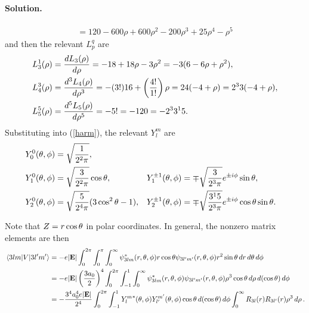 \documentclass[11pt]{article}
\newcommand{\refeq}[1]{(\ref{#1})}
\newenvironment{solution}
{
    \paragraph{Solution.}
    \ignorespaces
}
{
}
\begin{document}
\begin{solution}
\begin{align*}
		= 120 - 600 \rho + 600 \rho^2 - 200 \rho^3 + 25 \rho^4 - \rho^5
	\end{align*}
	and then the relevant $L_p^q$ are
	\begin{align*}
		L_3^1(\rho) &= \dv{L_3(\rho)}{\rho} 
		= -18 + 18 \rho - 3 \rho^2
		= -3 (6 - 6 \rho + \rho^2), \\
		L_4^3(\rho) &= \dv[3]{L_4(\rho)}{\rho}
		= -(3!) 16 + \left( \frac{4!}{1!} \right) \rho
		= 24 (-4 + \rho)
		= 2^3 3 (-4 + \rho), \\
		L_5^5(\rho) &= \dv[5]{L_5(\rho)}{\rho}
		= -5!
		= -120
		= -2^3 3^1 5.
	\end{align*}
	\clearpage
	Substituting into \refeq{harm}, the relevant $Y_l^m$ are
	\begin{align*}
		Y_0^0(\theta, \phi) &= \sqrt{\frac{1}{2^2 \pi}}, \\
		Y_1^0(\theta, \phi) &= \sqrt{\frac{3}{2^2 \pi}} \cos\theta, &
		Y_1^{\pm 1}(\theta, \phi) &= \mp \sqrt{\frac{3}{2^3 \pi}} e^{\pm i \phi} \sin\theta, \\
		Y_2^0(\theta, \phi) &= \sqrt{\frac{5}{2^4 \pi}} (3 \cos^2\theta - 1), &
		Y_2^{\pm1}(\theta, \phi) &= \mp \sqrt{\frac{3^1 5}{2^3 \pi}} e^{\pm i \phi} \cos\theta \sin\theta.
	\end{align*}
	
	Note that $Z = r \cos\theta$ in polar coordinates.  In general, the nonzero matrix elements are then
	\begin{align*}
		\mel{3 l m}{V}{3 l' m'} &= -e |\mathbf{E}| \int_0^{2\pi} \int_0^\pi \int_0^\infty \psi_{3 l m}^*(r, \theta, \phi) r \cos\theta \psi_{3 l' m'}(r, \theta, \phi) r^2 \sin\theta \dd{r} \dd{\theta} \dd{\phi} \\
		&= -e |\mathbf{E}| \left( \frac{3 a_0}{2} \right)^4 \int_0^{2\pi} \int_{-1}^1 \int_0^\infty \psi_{3 l m}^*(r, \theta, \phi) \psi_{3 l' m'}(r, \theta, \phi) \rho^3 \cos\theta \dd{\rho} \dd{(\cos\theta)} \dd{\phi} \\
		&= -\frac{3^4 a_0^4 e |\mathbf{E}|}{2^4} \int_0^{2\pi} \int_{-1}^1 {Y_l^m}^*(\theta, \phi) Y_{l'}^{m'}(\theta, \phi) \cos\theta \dd{(\cos\theta)} \dd{\phi} \int_0^\infty R_{3 l}(r) R_{3 l'}(r) \rho^3 \dd{\rho}.
	\end{align*}
	

\end{solution}
\end{document}
